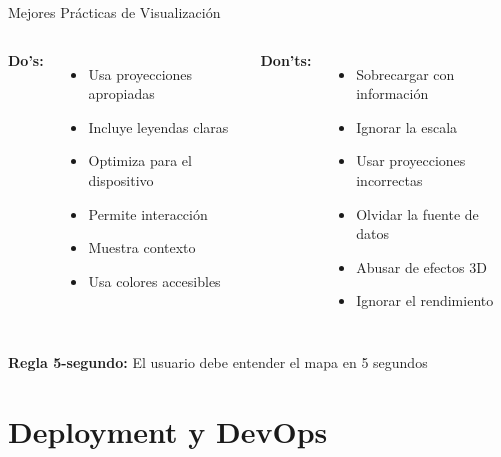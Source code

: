 \documentclass[10pt,aspectratio=169]{beamer}
\begin{document}
\begin{frame}{Mejores Prácticas de Visualización}
    \begin{columns}[T]
        \textbf{Do's:} \faCheckCircle
        \begin{itemize}
            \item Usa proyecciones apropiadas
            \item Incluye leyendas claras
            \item Optimiza para el dispositivo
            \item Permite interacción
            \item Muestra contexto
            \item Usa colores accesibles
        \end{itemize}
        
        \textbf{Don'ts:} \faTimesCircle
        \begin{itemize}
            \item Sobrecargar con información
            \item Ignorar la escala
            \item Usar proyecciones incorrectas
            \item Olvidar la fuente de datos
            \item Abusar de efectos 3D
            \item Ignorar el rendimiento
        \end{itemize}
    \end{columns}
    
    \vspace{0.5cm}
    \begin{tcolorbox}[colframe=blue!70,colback=blue!10]
        \centering\faInfo\space \textbf{Regla 5-segundo:} El usuario debe entender el mapa en 5 segundos
    \end{tcolorbox}
\end{frame}

\section{Deployment y DevOps}
\end{document}
